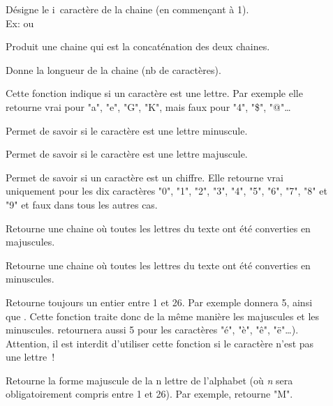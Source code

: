 	\begin{description}
		\item[]
		Désigne le i\ieme\ caractère de la chaine (en commençant à 1).
		\\Ex: 
		ou 
		\item[]
		Produit une chaine qui est la concaténation des deux chaines.
		\item[]
		Donne la longueur de la chaine (nb de caractères).
		\item[]
		Cette fonction indique si un caractère est une lettre. 
		Par exemple elle retourne vrai pour "a", "e", "G", "K", 
		mais faux pour "4", "\$", "@"\dots %
		\item[]	
		Permet de savoir si le caractère est une lettre minuscule.
		\item[]	
		Permet de savoir si le caractère est une lettre majuscule.
		\item[]	
		Permet de savoir si un caractère est un chiffre. 
		Elle retourne vrai uniquement pour les dix caractères 
		"0", "1", "2", "3", "4", "5", "6", "7", "8" et "9" 
		et faux dans tous les autres cas.
		\item[]
		Retourne une chaine où toutes les lettres du texte
		ont été converties en majuscules.
		\item[]
		Retourne une chaine où toutes les lettres du texte
		ont été converties en minuscules.
		\item[]
		Retourne toujours un entier entre 1 et 26. 
		Par exemple  donnera 5, 
		ainsi que . 
		Cette fonction traite donc de la même manière 
		les majuscules et les minuscules. 
		 retournera aussi 5 pour les caractères "é", "è", "ê", "ë"\dots). 
		Attention, il est interdit d’utiliser cette fonction 
		si le caractère n’est pas une lettre~!
		\item[]
		Retourne la forme majuscule de la n\ieme{} lettre de l’alphabet 
		(où \textit{n} sera obligatoirement compris entre 1 et 26). 
		Par exemple,  retourne "M".
		\item[]

\end{description}
